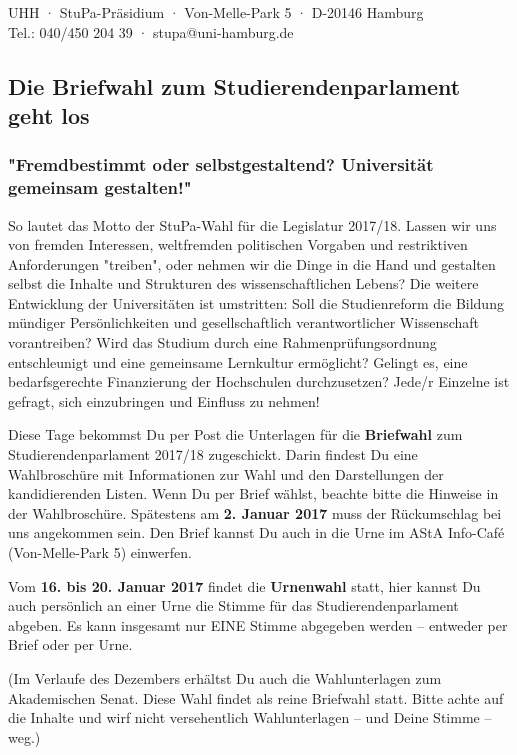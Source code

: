 \documentclass[a4paper,ngerman,headheight=80pt,12pt,DIV=calc]{scrartcl}
\begin{document}
    UHH · StuPa-Präsidium · Von-Melle-Park 5 · D-20146 Hamburg\\
    Tel.: 040/450 204 39 · stupa@uni-hamburg.de

    \subsection*{Die Briefwahl zum Studierendenparlament geht los}
    \subsubsection*{"Fremdbestimmt oder selbstgestaltend? Universität gemeinsam gestalten!"}

    So lautet das Motto der StuPa-Wahl für die Legislatur 2017/18. Lassen wir
    uns von fremden Interessen, weltfremden politischen Vorgaben und restriktiven
    Anforderungen "treiben", oder nehmen wir die Dinge in die Hand und gestalten
    selbst die Inhalte und Strukturen des wissenschaftlichen Lebens?
    Die weitere Entwicklung der Universitäten ist umstritten: Soll die Studienreform
    die Bildung mündiger Persönlichkeiten und gesellschaftlich verantwortlicher
    Wissenschaft vorantreiben? Wird das Studium durch eine Rahmenprüfungsordnung
    entschleunigt und eine gemeinsame Lernkultur ermöglicht? Gelingt es, eine
    bedarfsgerechte Finanzierung der Hochschulen durchzusetzen?
    Jede/r Einzelne ist gefragt, sich einzubringen und Einfluss zu nehmen!

    Diese Tage bekommst Du per Post die Unterlagen für die \textbf{Briefwahl} zum
    Studierendenparlament 2017/18 zugeschickt. Darin findest Du eine Wahlbroschüre
    mit Informationen zur Wahl und den Darstellungen der kandidierenden Listen.
    Wenn Du per Brief wählst, beachte bitte die Hinweise in der Wahlbroschüre.
    Spätestens am \textbf{2. Januar 2017} muss der Rückumschlag bei uns angekommen sein.
    Den Brief kannst Du auch in die Urne im AStA Info-Café (Von-Melle-Park 5)
    einwerfen.

    Vom \textbf{16. bis 20. Januar 2017} findet die \textbf{Urnenwahl} statt,
    hier kannst Du auch persönlich an einer Urne die Stimme für das
    Studierendenparlament abgeben. Es kann insgesamt nur EINE Stimme abgegeben
    werden – entweder per Brief oder per Urne.

    (Im Verlaufe des Dezembers erhältst Du auch die Wahlunterlagen zum
    Akademischen Senat. Diese Wahl findet als reine Briefwahl statt. Bitte achte
    auf die Inhalte und wirf nicht versehentlich Wahlunterlagen – und Deine
    Stimme – weg.)
\end{document}
